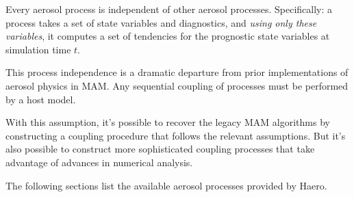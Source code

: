 \begin{assume}
  Every aerosol process is independent of other aerosol processes. Specifically:
  a process takes a set of state variables and diagnostics, and {\em using only
  these variables}, it computes a set of tendencies for the prognostic state variables at simulation time $t$.
\end{assume}

This process independence is a dramatic departure from prior implementations of
aerosol physics in MAM. Any sequential coupling of processes must be performed
by a host model.

With this assumption, it's possible to recover the legacy MAM algorithms by
constructing a coupling procedure that follows the relevant assumptions. But
it's also possible to construct more sophisticated coupling processes that take
advantage of advances in numerical analysis.

The following sections list the available aerosol processes provided by Haero.


